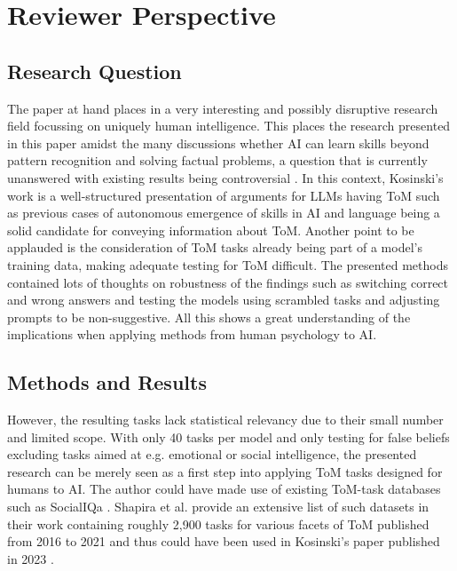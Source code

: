 \section{Reviewer Perspective}
\subsection{Research Question}
The paper at hand places in a very interesting and possibly disruptive research field focussing on uniquely human intelligence. This places the research presented in this paper amidst the many discussions whether AI can learn skills beyond pattern recognition and solving factual problems, a question that is currently unanswered with existing results being controversial \cite{critics1}. In this context, Kosinski's work is a well-structured presentation of arguments for LLMs having ToM such as previous cases of autonomous emergence of skills in AI and language being a solid candidate for conveying information about ToM. Another point to be applauded is the consideration of ToM tasks already being part of a model's training data, making adequate testing for ToM difficult. The presented methods contained lots of thoughts on robustness of the findings such as switching correct and wrong answers and testing the models using scrambled tasks and adjusting prompts to be non-suggestive. All this shows a great understanding of the implications when applying methods from human psychology to AI.

\subsection{Methods and Results}
However, the resulting tasks lack statistical relevancy due to their small number and limited scope. With only 40 tasks per model and only testing for false beliefs excluding tasks aimed at e.g. emotional or social intelligence, the presented research can be merely seen as a first step into applying ToM tasks designed for humans to AI. The author could have made use of existing ToM-task databases such as SocialIQa \cite{socialiqa}. Shapira et al. provide an extensive list of such datasets in their work containing roughly 2,900 tasks for various facets of ToM published from 2016 to 2021 and thus could have been used in Kosinski's paper published in 2023 \cite{critics1}.
 
